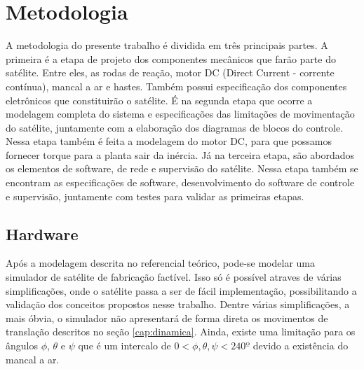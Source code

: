\chapter{Metodologia}

A metodologia do presente trabalho é dividida em três principais partes. A primeira é a etapa de projeto dos componentes mecânicos que farão parte do satélite. Entre eles, as rodas de reação, motor DC (Direct Current - corrente contínua), mancal a ar e hastes. Também possui especificação dos componentes eletrônicos que constituirão o satélite. É na segunda etapa que ocorre a modelagem completa do sistema e especificações das limitações de movimentação do satélite, juntamente com a elaboração dos diagramas de blocos do controle. Nessa etapa também é feita a modelagem do motor DC, para que possamos fornecer torque para a planta sair da inércia. Já na terceira etapa, são abordados os elementos de software, de rede e supervisão do satélite. Nessa etapa também se encontram as especificações de software, desenvolvimento do software de controle e supervisão, juntamente com testes para validar as primeiras etapas.

\section{Hardware}

Após a modelagem descrita no referencial teórico, pode-se modelar uma simulador de satélite de fabricação factível. Isso só é possível atraves de várias simplificações, onde o satélite passa a ser de fácil implementação, possibilitando a validação dos conceitos propostos nesse trabalho. Dentre várias simplificações, a mais óbvia, o simulador não apresentará de forma direta os movimentos de translação descritos no seção \ref{cap:dinamica}. Ainda, existe uma limitação para os ângulos $\phi$, $\theta$ e $\psi$ que é um intercalo de $0<\phi, \theta, \psi<240º$ devido a existência do mancal a ar.

